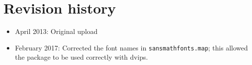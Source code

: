 \documentclass{amsart}
\begin{document}
\section{Revision history}

\begin{itemize}
\item
April 2013: Original upload
\item
February 2017: Corrected the font names in \texttt{sansmathfonts.map}; this allowed the package to be used correctly with \textsf{dvips}.  
\end{itemize}
\end{document}
